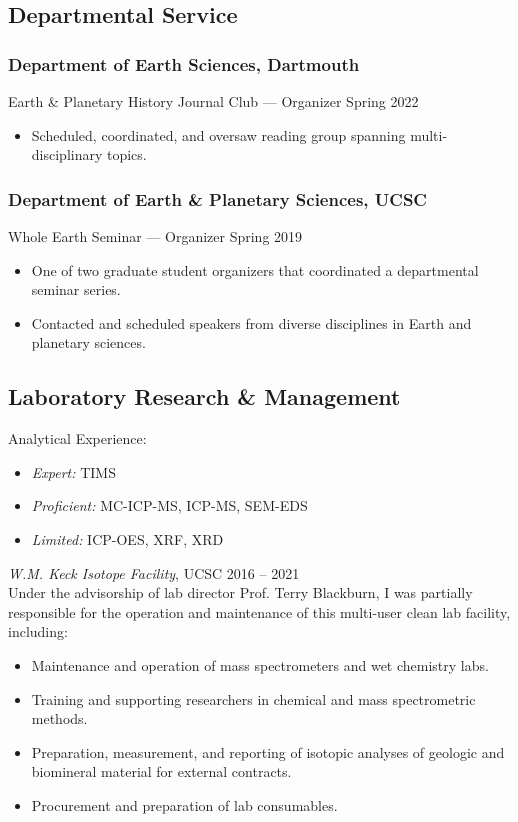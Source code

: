 \documentclass[10pt]{article}
\begin{document}
\subsection*{\textbf{Departmental Service}}
\subsubsection*{Department of Earth Sciences, Dartmouth}
Earth \& Planetary History Journal Club --- Organizer 	 \hfill	Spring 2022
\begin{itemize}
	\item Scheduled, coordinated, and oversaw reading group spanning multi-disciplinary topics.
\end{itemize}

\subsubsection*{Department of Earth \& Planetary Sciences, UCSC}
Whole Earth Seminar --- Organizer \hfill  Spring 2019
\begin{itemize}
	\item One of two graduate student organizers that coordinated a departmental seminar series.
	\item Contacted and scheduled speakers from diverse disciplines in Earth and planetary sciences.
\end{itemize}

\subsection*{\textbf{Laboratory Research \& Management}}
Analytical Experience:
	\begin{itemize} [label={}]
		\item \textit{Expert:} TIMS
		\item \textit{Proficient:} MC-ICP-MS, ICP-MS, SEM-EDS
		\item \textit{Limited:} ICP-OES, XRF, XRD
	\end{itemize} \vspace{1ex}	
 \textit{W.M. Keck Isotope Facility}, UCSC \hfill 2016 -- 2021\\
Under the advisorship of lab director Prof. Terry Blackburn, I was partially responsible for the operation and maintenance of this multi-user clean lab facility, including:
	\begin{itemize} 
	\item Maintenance and operation of mass spectrometers and wet chemistry labs.
	\item Training and supporting researchers in chemical and mass spectrometric methods.
	\item Preparation, measurement, and reporting of isotopic analyses of geologic and biomineral material for external contracts.
	\item Procurement and preparation of lab consumables.
	\end{itemize}
	
\end{document}
